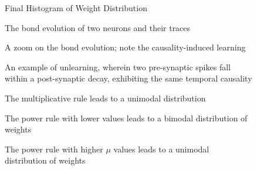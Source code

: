 \documentclass[a4paper,12pt]{article}
\begin{document}
\begin{center}
  \begin{figure}[h!]
    \caption{\label{pict1}Final Histogram of Weight Distribution}
  \end{figure}
\end{center}

\begin{center}
  \begin{figure}[h!]
    \caption{\label{pict1}The bond evolution of two neurons and their traces}
  \end{figure}
\end{center}

\begin{center}
  \begin{figure}[h!]
    \caption{\label{pict1}A zoom on the bond evolution; note the causality-induced learning}
  \end{figure}
\end{center}

\begin{center}
  \begin{figure}[h!]
    \caption{\label{pict1}An example of unlearning, wherein two pre-synaptic spikes fall within a post-synaptic decay, exhibiting the same temporal causality}
  \end{figure}
\end{center}

\begin{center}
  \begin{figure}[h!]
    \caption{\label{pict1}The multiplicative rule leads to a unimodal distribution}
  \end{figure}
\end{center}

\begin{center}
  \begin{figure}[h!]
    \caption{\label{pict1}The power rule with lower values leads to a bimodal distribution of weights}
  \end{figure}
\end{center}

\begin{center}
  \begin{figure}[h!]
    \caption{\label{pict1}The power rule with higher $\mu$ values leads to a unimodal distribution of weights}
  \end{figure}
\end{center}
\end{document}
